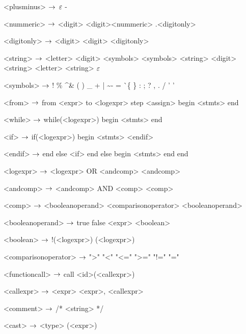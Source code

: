 \begin{grammar}
<plusminus> $\rightarrow$ $\varepsilon$
	\alt -

<nummeric> $\rightarrow$ <digit>
	\alt <digit><nummeric>
	\alt .<digitonly>

<digitonly> $\rightarrow$ <digit>
	\alt <digit> <digitonly>

<string> $\rightarrow$ <letter>
\alt <digit>
\alt <symbols>
\alt <symbols> <string>
\alt <digit> <string>
\alt <letter> <string>
\alt $\varepsilon$

<symbols> $\rightarrow$ !
\alt \%
\alt \^
\alt \&
\alt *
\alt (
\alt )
\alt \_
\alt +
\alt |
\alt \~
\alt -
\alt =
\alt \`
\alt \{
\alt \}
\alt [
\alt ]
\alt :
\alt ;
\alt ?
\alt ,
\alt .
\alt /
\alt ' '

<from> $\rightarrow$ from <expr> to <logexpr> step <assign>
	begin
		<stmts>
	end 

<while> $\rightarrow$ while(<logexpr>)
		begin
			<stmts>
		end

<if> $\rightarrow$ if(<logexpr>)
	begin
		<stmts>
	<endif>

<endif> $\rightarrow$ end
	else <if>
	\alt end
	else
	begin
		<stmts>
	end
	\alt end

<logexpr> $\rightarrow$ <logexpr> OR <andcomp>
		\alt <andcomp>

<andcomp> $\rightarrow$ <andcomp> AND <comp>

<comp> $\rightarrow$ <booleanoperand> <comparisonoperator> <booleanoperand>

<booleanoperand> $\rightarrow$ true
		\alt false
		\alt <boolean>

<boolean> $\rightarrow$ !(<logexpr>)
		\alt (<logexpr>)

<comparisonoperator> $\rightarrow$ ">"
				\alt "<"
				\alt "<="
				\alt ">="
				\alt "!="
				\alt "="

<functioncall> $\rightarrow$ call <id>(<callexpr>)

<callexpr> $\rightarrow$ <expr>
\alt <expr>, <callexpr>

<comment> $\rightarrow$ /* <string> */

<cast> $\rightarrow$ <type> (<expr>)

\end{grammar}